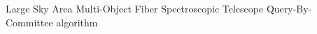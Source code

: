     {Large Sky Area Multi-Object Fiber Spectroscopic Telescope}
       {Query-By-Committee algorithm}
